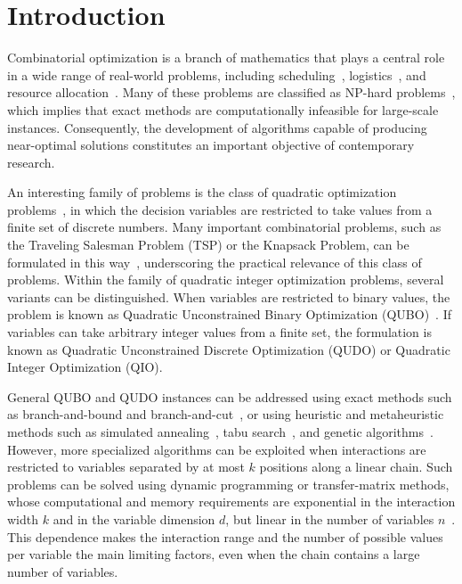 \documentclass[%
 reprint,
 amsmath,amssymb,
 aps,
 pra,showkeys,
]{revtex4-2}
\begin{document}
\maketitle

\section{Introduction}\label{sec:introduction}
Combinatorial optimization is a branch of mathematics that plays a central role in a wide range of real-world problems, including scheduling~\cite{flex_jssp}, logistics~\cite{VRP}, and resource allocation~\cite{Assignment}. Many of these problems are classified as NP-hard problems~\cite{combinatorial_optimization_theory_papa,combinatorial_optimization_theory_garey}, which implies that exact methods are computationally infeasible for large-scale instances. Consequently, the development of algorithms capable of producing near-optimal solutions constitutes an important objective of contemporary research.

An interesting family of problems is the class of quadratic optimization problems~\cite{quadratic}, in which the decision variables are restricted to take values from a finite set of discrete numbers. Many important combinatorial problems, such as the Traveling Salesman Problem (TSP) or the Knapsack Problem, can be formulated in this way~\cite{gonzálezbermejo2022gpsnewtspformulation, knapsack_qubo}, underscoring the practical relevance of this class of problems. Within the family of quadratic integer optimization problems, several variants can be distinguished. When variables are restricted to binary values, the problem is known as Quadratic Unconstrained Binary Optimization (QUBO)~\cite{quadratic_qubo}. If variables can take arbitrary integer values from a finite set, the formulation is known as Quadratic Unconstrained Discrete Optimization (QUDO) or Quadratic Integer Optimization (QIO).

General QUBO and QUDO instances can be addressed using exact methods
such as branch-and-bound and branch-and-cut~\cite{
brach_and_bound,branch_cut}, or using heuristic and metaheuristic
methods such as simulated annealing~\cite{simmulated_annealing_kirk},
tabu search~\cite{tabu_search_glover}, and genetic
algorithms~\cite{genetic_holland}. However, more specialized algorithms can be
exploited when interactions are restricted to variables separated by at
most $k$ positions along a linear chain. Such problems can be solved
using dynamic programming or transfer-matrix methods, whose computational and memory requirements are
exponential in the interaction width $k$ and in the variable dimension
$d$, but linear in the number of variables $n$~\cite{DynamicProgramming, TransferMatrixIsing}. This dependence makes the
interaction range and the number of possible values per variable the
main limiting factors, even when the chain contains a large number of
variables.
\end{document}
